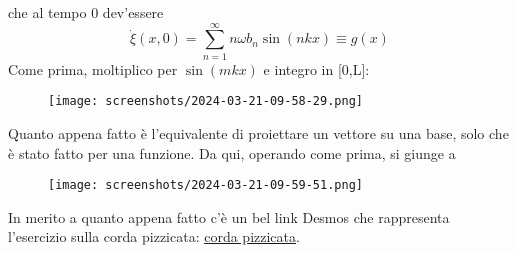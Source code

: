 che al tempo 0 dev'essere
\[
	\dot{\xi }(x,0) = \sum_{n=1}^{\infty} n \omega b_n \sin (nkx) \equiv  g(x)
\]
Come prima, moltiplico per \(\sin (mkx)\) e integro in [0,L]:
\begin{figure}[H]
	\centering
	\texttt{[image: screenshots/2024-03-21-09-58-29.png]}
\end{figure}
Quanto appena fatto è l'equivalente di proiettare un vettore su una base, solo che è stato fatto per una funzione. Da qui, operando come prima, si giunge a 
\begin{figure}[H]
	\centering
	\texttt{[image: screenshots/2024-03-21-09-59-51.png]}
\end{figure}
In merito a quanto appena fatto c'è un bel link Desmos che rappresenta l'esercizio sulla corda pizzicata: \href{https://www.desmos.com/calculator/wd8dn38ekr}{corda pizzicata}.